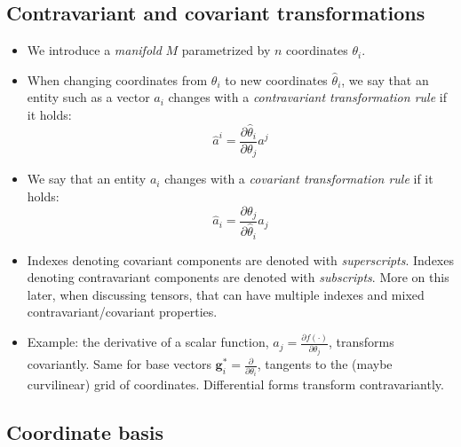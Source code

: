 \documentclass{digitaldynamics}
\def\vcovar#1{{\bm{#1}}^*}
\begin{document}
\subsection{Contravariant and covariant transformations}

\begin{itemize}
	\item We introduce a \textit{manifold} $M$ parametrized by $n$ coordinates $\theta_i$.
	
	\item When changing coordinates from $\theta_i$ to new coordinates $\hat{\theta}_i$, we say that 
	an entity such as a vector $a_i$ changes with a \textit{contravariant transformation rule} if it holds:
	\[
	\hat{a}^i = \frac{\partial \hat{\theta}_i}{\partial \theta_j} a^j
	\]
	
	\item We say that an entity $a_i$ changes with a \textit{covariant transformation rule} if it holds:
	\[
	\hat{a}_i = \frac{\partial {\theta}_j}{\partial \hat{\theta}_i} a_j
	\]
	
	\item Indexes denoting covariant components are denoted with \textit{superscripts}. Indexes denoting contravariant components are denoted with \textit{subscripts}. More on this later, when discussing tensors, that can have multiple indexes and mixed contravariant/covariant properties.
	
	\item Example: the derivative of a scalar function, $a_j=\frac{\partial f(\cdot)}{\partial \theta_j}$, transforms covariantly. Same for base vectors $\vcovar{g}_i = \frac{\partial}{\partial \theta_i}$, tangents to the (maybe curvilinear) grid of coordinates. Differential forms transform contravariantly. 
	
	
\end{itemize}



\subsection{Coordinate basis}
\end{document}
